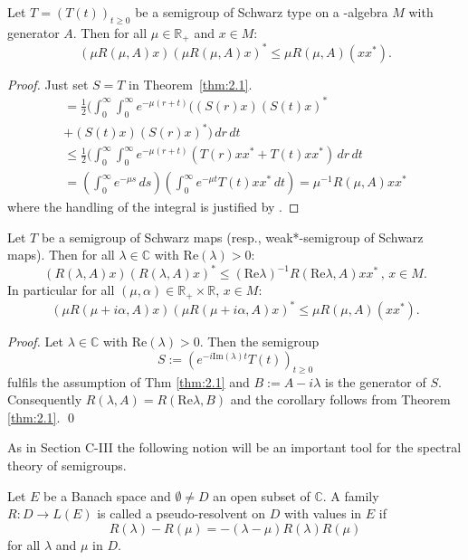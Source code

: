 \begin{corollary}\label{cor:2.2}
Let $ T = (T(t))_{t\geq0} $ be a semigroup of Schwarz type on a \CA-algebra $ M $ with generator $ A $.
Then for all $ \mu \in \mathbb{R}_{+} $ and $ x \in M $:
\[
(\mu R(\mu,A)x)(\mu R(\mu,A)x)^{*} \leq \mu R(\mu,A)(xx^{*}).
\]
\end{corollary}
%
\begin{proof}
Just set $ S = T $ in Theorem~\ref{thm:2.1}.
\begin{multline*}
= \frac{1}{2}(\int_{0}^\infty \int_{0}^\infty e^{-\mu(r+t)} ((S(r)x)(S(t)x)^{*} \\
+ (S(t)x)(S(r)x)^{*}) \, dr \, dt \\
\leq \frac{1}{2}(\int_{0}^\infty \int_{0}^\infty e^{-\mu(r+t)} (T(r)xx^{*} + T(t)xx^{*}) \, dr \, dt \\
= (\int_{0}^\infty e^{-\mu s} \, ds)(\int_{0}^\infty e^{-\mu t}T(t)xx^{*} \, dt) = \mu^{-1}R(\mu,A)xx^{*}
\end{multline*}
where the handling of the integral is justified by \cite[§8, n° 4, Proposition 9]{bourbaki:1955}.
\end{proof}


\begin{corollary}\label{cor:2.3}
Let $ T $ be a semigroup of Schwarz maps (resp., weak*-semigroup of Schwarz maps).
Then for all $ \lambda \in \mathbb{C} $ with $ \text{Re}(\lambda) > 0 $:
\[
(R(\lambda,A)x)(R(\lambda,A)x)^{*} \leq (\text{Re}\lambda)^{-1} R(\text{Re}\lambda,A)xx^{*} \, , \, x \in M .
\]
In particular for all $ (\mu,\alpha) \in \mathbb{R}_{+} \times \mathbb{R} $, $ x \in M $:
\[
(\mu R(\mu+i\alpha,A)x)(\mu R(\mu+i\alpha,A)x)^{*} \leq \mu R(\mu,A)(xx^{*}).
\]
\end{corollary}

\begin{proof}
Let $ \lambda \in \mathbb{C} $ with $ \text{Re}(\lambda) > 0 $.
Then the semigroup
\[
S := (e^{-i\text{Im}(\lambda)t}T(t))_{t\geq0}
\]
fulfils the assumption of Thm \ref{thm:2.1} and $ B := A - i\lambda $ is the generator of $ S $.
Consequently $ R(\lambda,A) = R(\text{Re}\lambda,B) $ and the corollary follows from Theorem \ref{thm:2.1}.
\qed
\end{proof}

As in Section C-III the following notion will be an important tool for the spectral theory of semigroups.

\begin{definition}\label{def:2.3}
Let $ E $ be a Banach space and $ \emptyset \neq D $ an open subset of $ \mathbb{C} $.
A family $ R: D \to L(E) $ is called a pseudo-resolvent on $ D $ with values in $ E $ if
\[
R(\lambda) - R(\mu) = -(\lambda - \mu)R(\lambda)R(\mu)
\]
for all $ \lambda $ and $ \mu $ in $ D $.
\end{definition}

